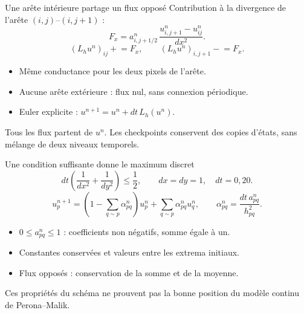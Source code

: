 \documentclass[aspectratio=169,11pt]{beamer}
\newcommand{\smallgap}{\vspace{0.18cm}}
\begin{document}
\begin{frame}[label=flux]{Une arête intérieure partage un flux opposé}
  Contribution à la divergence de l'arête $(i,j)$--$(i,j+1)$ :
  \[
    F_x= a^n_{i,j+1/2}\,\frac{u^n_{i,j+1}-u^n_{ij}}{dx^2}.
  \]
  \[
    (L_hu^n)_{ij}\mathrel{+}=F_x,
    \qquad (L_hu^n)_{i,j+1}\mathrel{-}=F_x.
  \]
  \begin{itemize}
    \item Même conductance pour les deux pixels de l'arête.
    \item Aucune arête extérieure : flux nul, sans connexion périodique.
    \item Euler explicite : $u^{n+1}=u^n+dt\,L_h(u^n)$.
  \end{itemize}
  \smallgap
  Tous les flux partent de $u^n$. Les checkpoints conservent des copies
  d'états, sans mélange de deux niveaux temporels.
\end{frame}

\begin{frame}[label=stabilite]{Une condition suffisante donne le maximum discret}
  \[
    dt\left(\frac{1}{dx^2}+\frac{1}{dy^2}\right)\leq\frac12,
    \qquad dx=dy=1,\quad dt=0{,}20.
  \]
  \[
    u^{n+1}_p=
    \left(1-\sum_{q\sim p}\alpha_{pq}^n\right)u^n_p
      +\sum_{q\sim p}\alpha_{pq}^n u^n_q,
    \qquad \alpha_{pq}^n=\frac{dt\,a_{pq}^n}{h_{pq}^2}.
  \]
  \begin{itemize}
    \item $0\leq a_{pq}^n\leq1$ : coefficients non négatifs, somme égale à un.
    \item Constantes conservées et valeurs entre les extrema initiaux.
    \item Flux opposés : conservation de la somme et de la moyenne.
  \end{itemize}
  {\footnotesize Ces propriétés du schéma ne prouvent pas la bonne position
  du modèle continu de Perona--Malik.}
\end{frame}
\end{document}
